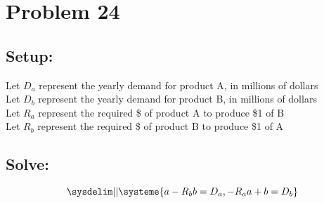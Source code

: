 \documentclass{article}
\begin{document}
\section*{Problem 24}
\subsection*{Setup: }
Let $D_a$ represent the yearly demand for product A, in millions of dollars\\
Let $D_b$ represent the yearly demand for product B, in millions of dollars\\
Let $R_a$ represent the required \$ of product A to produce \$1 of B\\
Let $R_b$ represent the required \$ of product B to produce \$1 of A
\subsection*{Solve: }
$$
\sysdelim||\systeme{
    a - R_b b = D_a,
    -R_a a + b = D_b
}
$$
\end{document}
